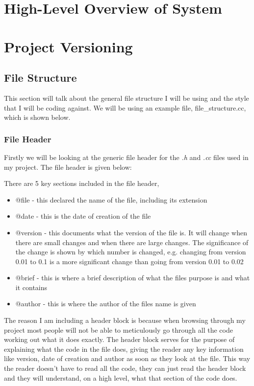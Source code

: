 \section{High-Level Overview of System}

\section{Project Versioning}
\subsection{File Structure}

This section will talk about the general file structure I will be using and the style that I will be coding against. We will be using an example file, file_structure.cc, which is shown below.
    
 

\subsubsection{File Header}

Firstly we will be looking at the generic file header for the \textit{.h} and \textit{.cc}  files used in my project. The file header is given below:



There are 5 key sections included in the file header,
\begin{itemize}
\item{@file - this declared the name of the file, including its extension}
\item{@date - this is the date of creation of the file}
\item{@version - this documents what the version of the file is. It will change when there are small changes and when there are large changes. The significance of the change is shown by which number is changed, e.g. changing from version 0.01 to 0.1 is a more significant change than going from version 0.01 to 0.02}
\item{@brief - this is where a brief description of what the files purpose is and what it contains}
\item{@author - this is where the author of the files name is given}
\end{itemize}

The reason I am including a header block is because when browsing through my project most people will not be able to meticulously go through all the code working out what it does exactly. The header block serves for the purpose of explaining what the code in the file does, giving the reader any key information like version, date of creation and author as soon as they look at the file. This way the reader doesn't have to read all the code, they can just read the header block and they will understand, on a high level, what that section of the code does.  

